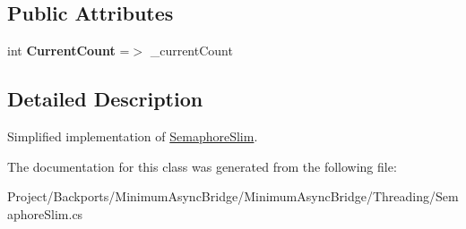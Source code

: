 \subsection*{Public Attributes}
\begin{DoxyCompactItemize}
\item 
\mbox{\label{class_system_1_1_threading_1_1_semaphore_slim_a508beacf8ec7d0e5fc983a0aca4dacdb}} 
int {\bfseries Current\+Count} =$>$ \+\_\+current\+Count
\end{DoxyCompactItemize}


\subsection{Detailed Description}
Simplified implementation of \hyperlink{class_system_1_1_threading_1_1_semaphore_slim}{Semaphore\+Slim}. 



The documentation for this class was generated from the following file\+:\begin{DoxyCompactItemize}
\item 
Project/\+Backports/\+Minimum\+Async\+Bridge/\+Minimum\+Async\+Bridge/\+Threading/Semaphore\+Slim.\+cs\end{DoxyCompactItemize}
